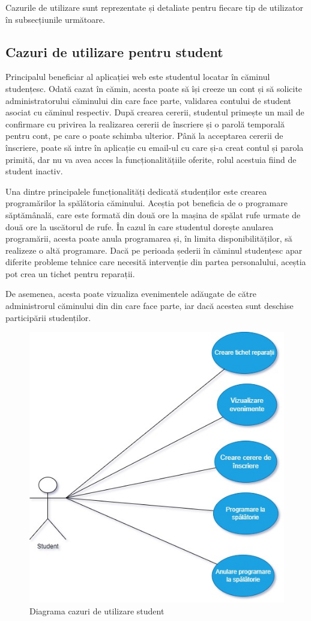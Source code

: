 \documentclass[12pt,a4paper]{report}
\theoremstyle{definition}
\theoremstyle{remark}
\begin{document}
\par Cazurile de utilizare sunt reprezentate și detaliate pentru fiecare tip de utilizator în subsecțiunile următoare.

\subsection{Cazuri de utilizare pentru student}
\par Principalul beneficiar al aplicației web este studentul locatar în căminul studențesc. Odată cazat în cămin, acesta poate să își creeze un cont și să solicite administratorului căminului din care face parte, validarea contului de student asociat cu căminul respectiv. După crearea cererii, studentul primește un mail de confirmare cu privirea la realizarea cererii de înscriere și o parolă temporală pentru cont, pe care o poate schimba ulterior. Până la acceptarea cererii de înscriere, poate să intre în aplicație cu email-ul cu care și-a creat contul și parola primită, dar nu va avea acces la funcționalitățiile oferite, rolul acestuia fiind de student inactiv.

\par Una dintre principalele funcționalități dedicată studenților este crearea \textnormal{pro\-gra\-mă\-ri\-lor} la spălătoria căminului. Aceștia pot beneficia de o programare săptămânală, care este formată din două ore la mașina de spălat rufe urmate de două ore la uscătorul de rufe. În cazul în care studentul dorește anularea programării, acesta poate anula programarea și, în limita disponibilităților, să realizeze o altă programare. Dacă pe perioada șederii în căminul studențesc apar diferite probleme tehnice care necesită intervenție din partea personalului, aceștia pot crea un tichet pentru reparații.

\par De asemenea, acesta poate vizualiza evenimentele adăugate de către administrorul căminului din  din care face parte, iar dacă acestea sunt deschise participării studenților.

\begin{figure}[H]
    \centering
    \includegraphics[width=0.6\linewidth,height=0.4\textheight]{resurse/diagrame/UVTDors_UseCaseStudent.jpg}
    \caption{Diagrama cazuri de utilizare student}
\end{figure}
\end{document}
